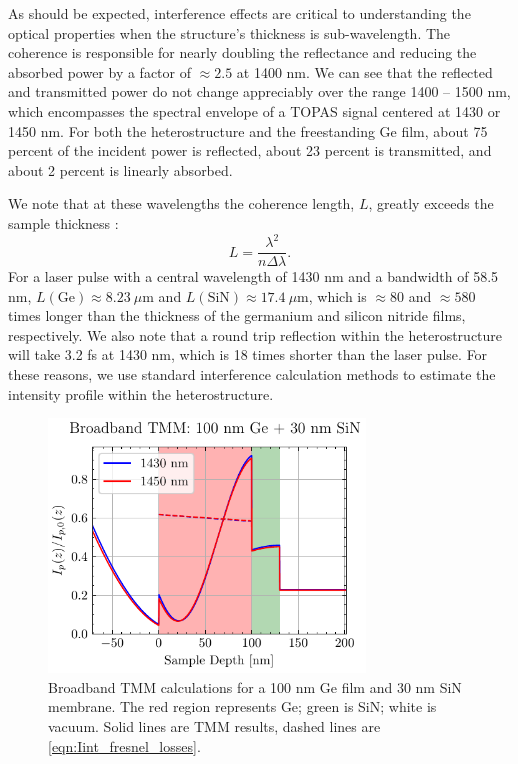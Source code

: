 As should be expected, interference effects are critical to understanding the optical properties when the structure's thickness is sub-wavelength. The coherence is responsible for nearly doubling the reflectance and reducing the absorbed power by a factor of $\approx 2.5$ at 1400 nm.  We can see that the reflected and transmitted power do not change appreciably over the range {1400 -- 1500 nm}, which encompasses the spectral envelope of a TOPAS signal centered at 1430 or 1450 nm. For both the heterostructure and the freestanding Ge film, about 75 percent of the incident power is reflected, about 23 percent is transmitted, and about 2 percent is linearly absorbed.

We note that at these wavelengths the coherence length, $L$, greatly exceeds the sample thickness \cite{katsidisGeneralTransfermatrixMethod2002}:
\begin{equation}
L = \frac{\lambda^2}{n \Delta \lambda}.
\end{equation}
For a laser pulse with a central wavelength of 1430 nm and a bandwidth of 58.5 nm, $L(\textrm{Ge}) \approx 8.23 \ \mu\textrm{m}$ and $L(\textrm{SiN}) \approx 17.4 \ \mu\textrm{m}$, which is $\approx 80$ and $\approx 580$ times longer than the thickness of the germanium and silicon nitride films, respectively. We also note that a round trip reflection within the heterostructure will take 3.2 fs at 1430 nm, which is 18 times shorter than the laser pulse. For these reasons, we use standard interference calculation methods to estimate the intensity profile within the heterostructure.

\begin{figure}
	\centering
	\includegraphics[width=0.75\textwidth]{figures/chap4/TMM_1430_1450_broad_Int.pdf}
	\caption{Broadband TMM calculations for a {100 nm} Ge film and {30 nm} SiN membrane. The red region represents Ge; green is SiN; white is vacuum. Solid lines are TMM results, dashed lines are \cref{eqn:Iint_fresnel_losses}.}
	\label{fig:TMM_1430_1450_broad_Int}
\end{figure}

